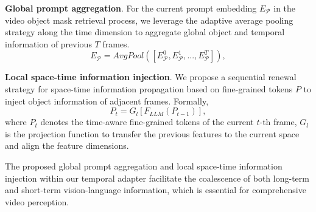 \noindent \textbf{Global prompt aggregation}.
For the current prompt embedding $E_{\mathcal{P}}$ in the video object mask retrieval process, we leverage the adaptive average pooling strategy along the time dimension to aggregate global object and temporal information of previous $T$ frames. 
\begin{equation} \label{eq1}
E_{\mathcal{P}} =  AvgPool([E_{\mathcal{P}}^0, E_{\mathcal{P}}^1, ... , E_{\mathcal{P}}^T]),
\end{equation}

\noindent \textbf{Local space-time information injection}.
We propose a sequential renewal strategy for space-time information propagation based on fine-grained tokens $P$ to inject object information of adjacent frames. Formally,
\begin{equation} \label{eq2}
P_t =  G_{l}[F_{LLM}(P_{t-1})],
\end{equation}
where $P_t$ denotes the time-aware fine-grained tokens of the current $t$-th frame, $G_{l}$ is the projection function to transfer the previous features to the current space and align the feature dimensions.

The proposed global prompt aggregation and local space-time information injection within our temporal adapter facilitate the coalescence of both long-term and short-term vision-language information, which is essential for comprehensive video perception.

